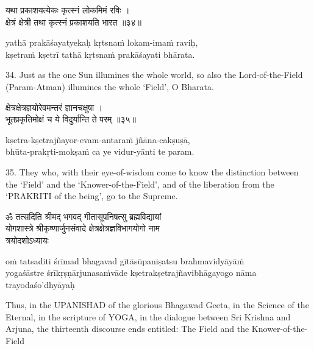 \begin{gitaverse}
यथा प्रकाशयत्येकः कृत्स्नं लोकमिमं रविः । \\
क्षेत्रं क्षेत्री तथा कृत्स्नं प्रकाशयति भारत ॥३४॥
\end{gitaverse}

\begin{transliteration}
yathā prakāśayatyekaḥ kṛtsnaṁ lokam-imaṁ raviḥ, \\
kṣetraṁ kṣetrī tathā kṛtsnaṁ prakāśayati bhārata.
\end{transliteration}

34. Just as the one Sun illumines the whole world, so also the
Lord-of-the-Field (Param-Atman) illumines the whole `Field', O Bharata.

\begin{gitaverse}
क्षेत्रक्षेत्रज्ञयोरेवमन्तरं ज्ञानचक्षुषा । \\
भूतप्रकृतिमोक्षं च ये विदुर्यान्ति ते परम् ॥३५॥
\end{gitaverse}

\begin{transliteration}
kṣetra-kṣetrajñayor-evam-antaraṁ jñāna-cakṣuṣā, \\
bhūta-prakṛti-mokṣaṁ ca ye vidur-yānti te param.
\end{transliteration}

35. They who, with their eye-of-wisdom come to know the distinction between the
`Field' and the `Knower-of-the-Field', and of the liberation from the `PRAKRITI
of the being', go to the Supreme.

\begin{gitaverse}
ॐ तत्सदिति श्रीमद् भगवद् गीतासूपनिषत्सु ब्रह्मविद्यायां \\
योगशास्त्रे श्रीकृष्णार्जुनसंवादे क्षेत्रक्षेत्रज्ञविभागयोगो नाम \\
त्रयोदशोऽध्यायः
\end{gitaverse}

\begin{transliteration}
oṁ tatsaditi śrīmad bhagavad gītāsūpaniṣatsu brahmavidyāyāṁ \\
yogaśāstre śrīkṛṣṇārjunasaṁvāde kṣetrakṣetrajñavibhāgayogo nāma \\
trayodaśo'dhyāyaḥ
\end{transliteration}

Thus, in the UPANISHAD of the glorious Bhagawad Geeta, in the Science of the
Eternal, in the scripture of YOGA, in the dialogue between Sri Krishna and
Arjuna, the thirteenth discourse ends entitled: The Field and the
Knower-of-the-Field
